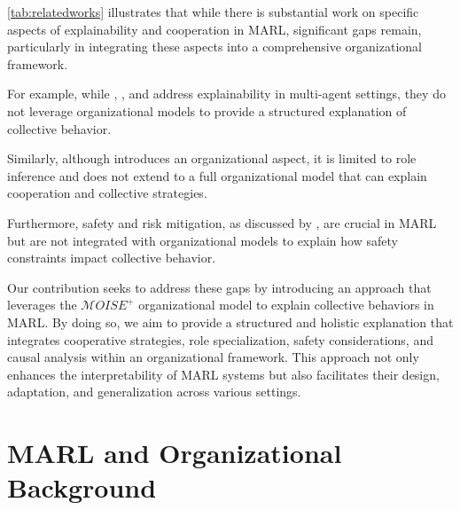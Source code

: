 \documentclass[sn-mathphys-num]{sn-jnl}%
\theoremstyle{thmstyleone}%
\theoremstyle{thmstyletwo}%
\theoremstyle{thmstylethree}%
\begin{document}
\autoref{tab:relatedworks} illustrates that while there is substantial work on specific aspects of explainability and cooperation in MARL, significant gaps remain, particularly in integrating these aspects into a comprehensive organizational framework.

For example, while \cite{foerster2018interpretable}, \cite{hu2020towards}, and \cite{li2020survey} address explainability in multi-agent settings, they do not leverage organizational models to provide a structured explanation of collective behavior.

Similarly, although \cite{kazhdan2020marlme} introduces an organizational aspect, it is limited to role inference and does not extend to a full organizational model that can explain cooperation and collective strategies.

Furthermore, safety and risk mitigation, as discussed by \cite{alshiekh2018safety}, are crucial in MARL but are not integrated with organizational models to explain how safety constraints impact collective behavior.

Our contribution seeks to address these gaps by introducing an approach that leverages the $\mathcal{M}OISE^+$ organizational model to explain collective behaviors in MARL. By doing so, we aim to provide a structured and holistic explanation that integrates cooperative strategies, role specialization, safety considerations, and causal analysis within an organizational framework. This approach not only enhances the interpretability of MARL systems but also facilitates their design, adaptation, and generalization across various settings.


\section{MARL and Organizational Background}\label{sec:background}



\end{document}
